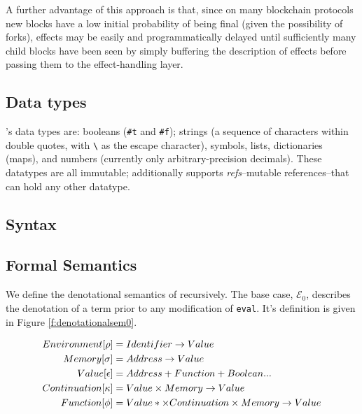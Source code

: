 A further advantage of this approach is that, since on many blockchain
protocols new blocks have a low initial probability of being final (given the
possibility of forks), effects may be easily and programmatically delayed until
sufficiently many child blocks have been seen by simply buffering the
description of effects before passing them to the effect-handling layer.

\subsection{Data types} \rad's data types are: booleans (\texttt{\#t} and
\texttt{\#f}); strings (a sequence of characters within double quotes, with
\texttt{\textbackslash} as the escape character), symbols, lists, dictionaries
(maps), and numbers (currently only arbitrary-precision decimals). These
datatypes are all immutable; additionally \rad supports \emph{refs}--mutable
references--that can hold any other datatype.

\subsection{Syntax}


\subsection{Formal Semantics} We define the denotational semantics of \rad
recursively. The base case, $\mathcal{E}_{0}$, describes the denotation of a
term prior to any modification of \texttt{eval}. It's definition is given in
Figure \ref{f:denotationalsem0}.

\begin{figure}[H]
\begin{align*}
    Environment [\rho] &= Identifier \rightarrow Value \\
    Memory [\sigma] &= Address \rightarrow Value \\
    Value [\epsilon] &= Address + Function + Boolean ... \\
    Continuation [\kappa] &= Value \times Memory \rightarrow Value \\
    Function [\phi] &= Value* \times Continuation \times Memory \rightarrow Value
\end{align*}
\label{f:denotationalsemleged}
\end{figure}


